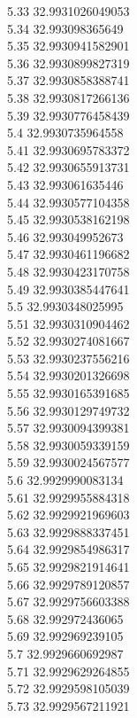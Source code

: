 {5.33	32.9931026049053\\
5.34	32.993098365649\\
5.35	32.9930941582901\\
5.36	32.9930899827319\\
5.37	32.9930858388741\\
5.38	32.9930817266136\\
5.39	32.9930776458439\\
5.4	32.9930735964558\\
5.41	32.9930695783372\\
5.42	32.9930655913731\\
5.43	32.993061635446\\
5.44	32.9930577104358\\
5.45	32.9930538162198\\
5.46	32.993049952673\\
5.47	32.9930461196682\\
5.48	32.9930423170758\\
5.49	32.9930385447641\\
5.5	32.9930348025995\\
5.51	32.9930310904462\\
5.52	32.9930274081667\\
5.53	32.9930237556216\\
5.54	32.9930201326698\\
5.55	32.9930165391685\\
5.56	32.9930129749732\\
5.57	32.9930094399381\\
5.58	32.9930059339159\\
5.59	32.9930024567577\\
5.6	32.9929990083134\\
5.61	32.9929955884318\\
5.62	32.9929921969603\\
5.63	32.9929888337451\\
5.64	32.9929854986317\\
5.65	32.9929821914641\\
5.66	32.9929789120857\\
5.67	32.9929756603388\\
5.68	32.992972436065\\
5.69	32.992969239105\\
5.7	32.9929660692987\\
5.71	32.9929629264855\\
5.72	32.9929598105039\\
5.73	32.9929567211921\\
}
